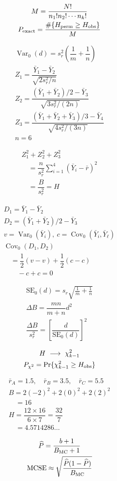 \[
\begin{gathered}
M=\dfrac{N!}{n_1!n_2!\cdots n_k!} \\
P_{\rm exact}=\dfrac{\#\{H_{\rm perm}\geq H_{\rm obs}\}}{M}
\end{gathered}
\]

\[
\begin{gathered}
\operatorname{Var}_0(d)=s_r^2\left(\dfrac{1}{m}+\dfrac{1}{n}\right) \\
Z_1=\dfrac{\bar Y_1-\bar Y_2}{\sqrt{2s_r^2/n}} \\
Z_2=\dfrac{(\bar Y_1+\bar Y_2)/2-\bar Y_3}{\sqrt{3s_r^2/(2n)}} \\
Z_3=\dfrac{(\bar Y_1+\bar Y_2+\bar Y_3)/3-\bar Y_4}{\sqrt{4s_r^2/(3n)}} \\
n=6
\end{gathered}
\]

\[
\begin{gathered}
Z_1^2+Z_2^2+Z_3^2 \\
\quad=\dfrac{n}{s_r^2}\sum_{i=1}^{4}(\bar Y_i-\bar r)^2 \\
\quad=\dfrac{B}{s_r^2}=H
\end{gathered}
\]

\[
\begin{gathered}
D_1=\bar Y_1-\bar Y_2 \\
D_2=(\bar Y_1+\bar Y_2)/2-\bar Y_3 \\
v=\operatorname{Var}_0(\bar Y_i),\ c=\operatorname{Cov}_0(\bar Y_i,\bar Y_\ell) \\
\operatorname{Cov}_0(D_1,D_2) \\
\quad=\dfrac{1}{2}(v-v)+\dfrac{1}{2}(c-c) \\
\qquad-c+c=0
\end{gathered}
\]

\[
\begin{gathered}
\mathrm{SE}_0(d)=s_r\sqrt{\frac{1}{m}+\frac{1}{n}} \\
\Delta B=\dfrac{mn}{m+n}d^2 \\
\dfrac{\Delta B}{s_r^2}=\left[\dfrac{d}{\mathrm{SE}_0(d)}\right]^2
\end{gathered}
\]

\[
\begin{gathered}
H\ \longrightarrow\ \chi^2_{k-1} \\
P_{\chi^2}=\Pr\{\chi^2_{k-1}\geq H_{\rm obs}\}
\end{gathered}
\]

\[
\begin{gathered}
\bar r_A=1.5,\quad\bar r_B=3.5,\quad\bar r_C=5.5 \\
B=2(-2)^2+2(0)^2+2(2)^2 \\
\quad=16 \\
H=\dfrac{12\times16}{6\times7}=\dfrac{32}{7} \\
\quad=4.5714286\ldots
\end{gathered}
\]

\[
\begin{gathered}
\widehat P=\dfrac{b+1}{B_{\rm MC}+1} \\
\operatorname{MCSE}\approx\sqrt{\frac{\widehat P(1-\widehat P)}{B_{\rm MC}}}
\end{gathered}
\]